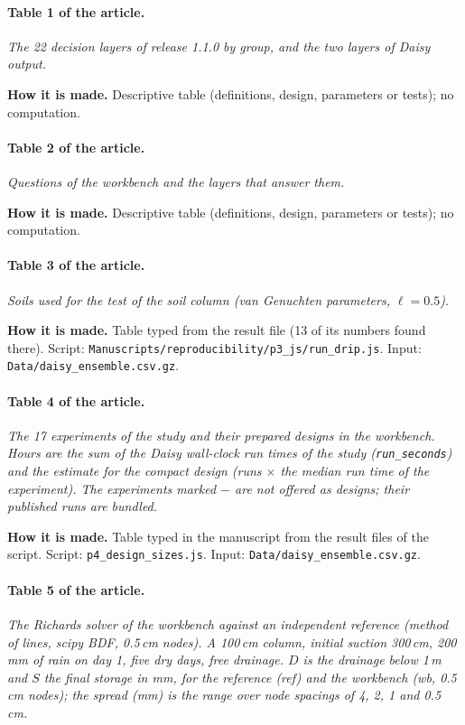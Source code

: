\paragraph{Table 1 of the article.} \emph{The 22 decision layers of release 1.1.0 by group, and the two layers of Daisy output.}

\textbf{How it is made.} Descriptive table (definitions, design, parameters or tests); no computation.

\paragraph{Table 2 of the article.} \emph{Questions of the workbench and the layers that answer them.}

\textbf{How it is made.} Descriptive table (definitions, design, parameters or tests); no computation.

\paragraph{Table 3 of the article.} \emph{Soils used for the test of the soil column (van Genuchten parameters, $\ell=0.5$).}

\textbf{How it is made.} Table typed from the result file (13 of its numbers found there). Script: \nolinkurl{Manuscripts/reproducibility/p3_js/run_drip.js}. Input: \nolinkurl{Data/daisy_ensemble.csv.gz}.

\paragraph{Table 4 of the article.} \emph{The 17 experiments of the study and their prepared designs in the workbench. Hours are the sum of the Daisy wall-clock run times of the study (\texttt{run\_seconds}) and the estimate for the compact design (runs $\times$ the median run time of the experiment). The experiments marked $-$ are not offered as designs; their published runs are bundled.}

\textbf{How it is made.} Table typed in the manuscript from the result files of the script. Script: \nolinkurl{p4_design_sizes.js}. Input: \nolinkurl{Data/daisy_ensemble.csv.gz}.

\paragraph{Table 5 of the article.} \emph{The Richards solver of the workbench against an independent reference (method of lines, scipy BDF, 0.5\,cm nodes). A 100\,cm column, initial suction 300\,cm, 200\,mm of rain on day 1, five dry days, free drainage. $D$ is the drainage below 1\,m and $S$ the final storage in mm, for the reference (ref) and the workbench (wb, 0.5\,cm nodes); the spread (mm) is the range over node spacings of 4, 2, 1 and 0.5\,cm.}


